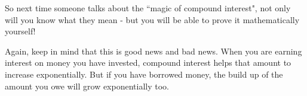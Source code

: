         
        \label{m39334*id73760}So next time someone talks about the ``magic of compound interest", not only will you know what they mean - but you will be able to prove it mathematically yourself!\par 
        \label{m39334*id73766}Again, keep in mind that this is good news and bad news. When you are earning interest on money you have invested, compound interest helps that amount to increase exponentially. But if you have borrowed money, the build up of the amount you owe will grow exponentially too.\par 
%       
